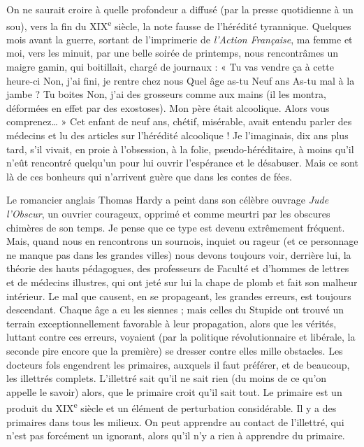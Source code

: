\documentclass[french,twoside]{book} %
\begin{document}
On ne saurait croire à quelle profondeur a diffusé (par la presse quotidienne à un sou), vers la fin du XIX\textsuperscript{e} siècle, la note fausse de l’hérédité tyrannique. Quelques mois avant la guerre, sortant de l’imprimerie de {\itshape l’Action Française}, ma femme et moi, vers les minuit, par une belle soirée de printemps, nous rencontrâmes un maigre gamin, qui boitillait, chargé de journaux : « Tu vas vendre ça à cette heure-ci Non, j’ai fini, je rentre chez nous Quel âge as-tu Neuf ans As-tu mal à la jambe ? Tu boites Non, j’ai des grosseurs comme aux mains (il les montra, déformées en effet par des exostoses). Mon père était alcoolique. Alors vous comprenez… » Cet enfant de neuf ans, chétif, misérable, avait entendu parler des médecins et lu des articles sur l’hérédité alcoolique ! Je l’imaginais, dix ans plus tard, s’il vivait, en proie à l’obsession, à la folie, pseudo-héréditaire, à moins qu’il n’eût rencontré quelqu’un pour lui ouvrir l’espérance et le désabuser. Mais ce sont là de ces bonheurs qui n’arrivent guère que dans les contes de fées.\par
Le romancier anglais Thomas Hardy a peint dans son célèbre ouvrage {\itshape Jude l’Obscur}, un ouvrier courageux, opprimé et comme meurtri par les obscures chimères de son temps. Je pense que ce type est devenu extrêmement fréquent. Mais, quand nous en rencontrons un sournois, inquiet ou rageur (et ce personnage ne manque pas dans les grandes villes) nous devons toujours voir, derrière lui, la théorie des hauts pédagogues, des professeurs de Faculté et d’hommes de lettres et de médecins illustres, qui ont jeté sur lui la chape de plomb et fait son malheur intérieur. Le mal que causent, en se propageant, les grandes erreurs, est toujours descendant. Chaque âge a eu les siennes ; mais celles du Stupide ont trouvé un terrain exceptionnellement favorable à leur propagation, alors que les vérités, luttant contre ces erreurs, voyaient (par la politique révolutionnaire et libérale, la seconde pire encore que la première) se dresser contre elles mille obstacles. Les docteurs fols engendrent les primaires, auxquels il faut préférer, et de beaucoup, les illettrés complets. L’illettré sait qu’il ne sait rien (du moins de ce qu’on appelle le savoir) alors, que le primaire croit qu’il sait tout. Le primaire est un produit du XIX\textsuperscript{e} siècle et un élément de perturbation considérable. Il y a des primaires dans tous les milieux. On peut apprendre au contact de l’illettré, qui n’est pas forcément un ignorant, alors qu’il n’y a rien à apprendre du primaire.\par
\end{document}
